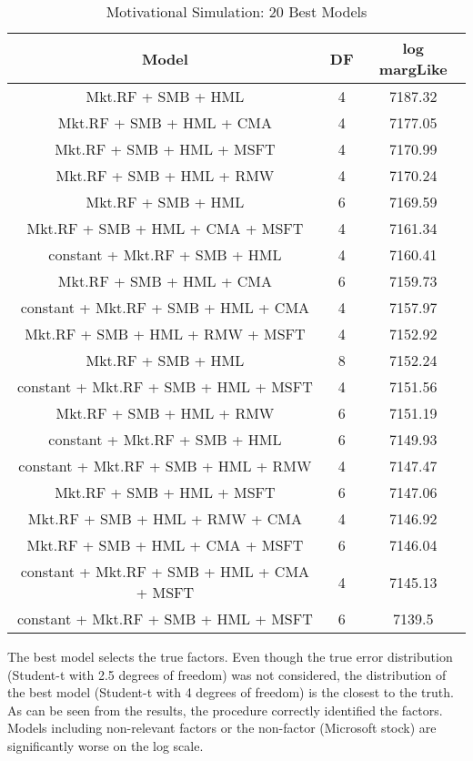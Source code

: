 \documentclass[12pt]{article}
\begin{document}
\begin{table}[ht]
	
	\centering
	\footnotesize
	\begin{tabular}{ccc}
		\hline
		Model & DF & log margLike \\ 
		\hline
Mkt.RF + SMB + HML & 4 & 7187.32 \\ 
Mkt.RF + SMB + HML + CMA & 4 & 7177.05 \\ 
Mkt.RF + SMB + HML + MSFT & 4 & 7170.99 \\ 
Mkt.RF + SMB + HML + RMW & 4 & 7170.24 \\ 
Mkt.RF + SMB + HML & 6 & 7169.59 \\ 
Mkt.RF + SMB + HML + CMA + MSFT & 4 & 7161.34 \\ 
constant + Mkt.RF + SMB + HML & 4 & 7160.41 \\ 
Mkt.RF + SMB + HML + CMA & 6 & 7159.73 \\ 
constant + Mkt.RF + SMB + HML + CMA & 4 & 7157.97 \\ 
Mkt.RF + SMB + HML + RMW + MSFT & 4 & 7152.92 \\ 
Mkt.RF + SMB + HML & 8 & 7152.24 \\ 
constant + Mkt.RF + SMB + HML + MSFT & 4 & 7151.56 \\ 
Mkt.RF + SMB + HML + RMW & 6 & 7151.19 \\ 
constant + Mkt.RF + SMB + HML & 6 & 7149.93 \\ 
constant + Mkt.RF + SMB + HML + RMW & 4 & 7147.47 \\ 
Mkt.RF + SMB + HML + MSFT & 6 & 7147.06 \\ 
Mkt.RF + SMB + HML + RMW + CMA & 4 & 7146.92 \\ 
Mkt.RF + SMB + HML + CMA + MSFT & 6 & 7146.04 \\ 
constant + Mkt.RF + SMB + HML + CMA + MSFT & 4 & 7145.13 \\ 
constant + Mkt.RF + SMB + HML + MSFT & 6 & 7139.5 \\ 
		\hline
	\end{tabular}
	\caption{Motivational Simulation: 20 Best Models}
\end{table}

The best model selects the true factors. Even though the true error distribution (Student-t with 2.5 degrees of freedom) was not considered, the distribution of the best model (Student-t with 4 degrees of freedom) is the closest to the truth. \\
As can be seen from the results, the procedure correctly identified the factors. Models including non-relevant factors or the non-factor (Microsoft stock) are significantly worse on the log scale.
\end{document}
